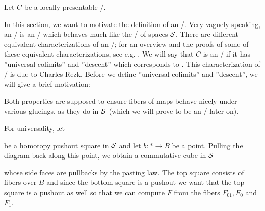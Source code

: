 Let $C$ be a locally presentable \inftycat/.

In this section, we want to motivate the definition of an \inftytop/.
Very vaguely speaking, an \inftytop/ is an \inftycat/ which behaves much like the \inftycat/ of spaces $\mathcal{S}$.
There are different equivalent characterizations of an \inftytop/; for an overview and the proofs of some of these equivalent characterizations, see e.g. %
.
We will say that $C$ is an \inftytop/ if it has ''universal colimits'' and ''descent'' which corresponds to %
.
This characterization of \inftytops/ is due to Charles Rezk.
Before we define ''universal colimits'' and ''descent'', we will give a brief motivation:

Both properties are supposed to ensure fibers of maps behave nicely under various glueings, as they do in $\mathcal{S}$ (which we will prove to be an \inftytop/ later on).

For universality, let 
\begin{center}
\end{center}
be a homotopy pushout square in $\mathcal{S}$ and let $b\colon*\to B$ be a point.
Pulling the diagram back along this point, we obtain a commutative cube in $\mathcal{S}$
\begin{center}
\end{center}
whose side faces are pullbacks by the pasting law.
The top square consists of fibers over $B$ and since the bottom square is a pushout we want that the top square is a pushout as well so that we can compute $F$ from the fibers $F_{01},F_0$ and $F_1$. 

